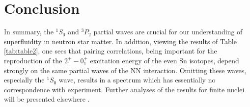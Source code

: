 \documentclass{ws-p9-75x6-50}
\begin{document}
\section{Conclusion} \label{sec:sec4}


In summary, the $^1S_0$ and $^3P_2$ partial waves are crucial for our
understanding of superfluidity in neutron star matter. In addition, viewing
the results of Table \ref{tab:table2}, one sees that 
pairing correlations, being important for the 
reproduction of the $2^+_1-0^+_1$ excitation energy of
the even Sn isotopes, depend strongly on the same  partial waves
of the NN interaction. Omitting these waves, especially the  $^1S_0$ wave,
results in a spectrum which has essentially no correspondence with experiment.
Further analyses of the results for finite nuclei will be presented elsewhere
\cite{eho2000}.
\end{document}
